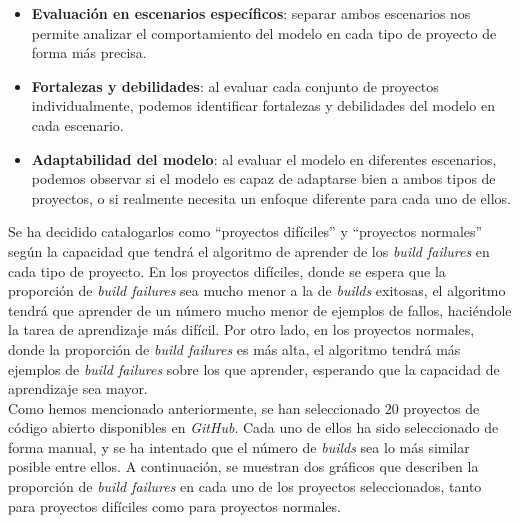 \begin{itemize}
    \item \textbf{Evaluación en escenarios específicos}: separar ambos escenarios nos permite
    analizar el comportamiento del modelo en cada tipo de proyecto de forma más precisa.\\

    \item \textbf{Fortalezas y debilidades}: al evaluar cada conjunto de proyectos individualmente,
    podemos identificar fortalezas y debilidades del modelo en cada escenario.\\

    \item \textbf{Adaptabilidad del modelo}: al evaluar el modelo en diferentes escenarios, podemos
    observar si el modelo es capaz de adaptarse bien a ambos tipos de proyectos, o si realmente
    necesita un enfoque diferente para cada uno de ellos.\\
\end{itemize}

Se ha decidido catalogarlos como ``proyectos difíciles'' y ``proyectos normales'' según la
capacidad que tendrá el algoritmo de aprender de los \textit{build failures} en cada tipo de 
proyecto. En los proyectos difíciles, donde se espera que la proporción de \textit{build
failures} sea mucho menor a la de \textit{builds} exitosas, el algoritmo tendrá que aprender
de un número mucho menor de ejemplos de fallos, haciéndole la tarea de aprendizaje más difícil.
Por otro lado, en los proyectos normales, donde la proporción de \textit{build failures} es
más alta, el algoritmo tendrá más ejemplos de \textit{build failures} sobre los que aprender,
esperando que la capacidad de aprendizaje sea mayor.\\

Como hemos mencionado anteriormente, se han seleccionado $20$ proyectos de código abierto
disponibles en \textit{GitHub}. Cada uno de ellos ha sido seleccionado de forma manual, y se
ha intentado que el número de \textit{builds} sea lo más similar posible entre ellos. A
continuación, se muestran dos gráficos que describen la proporción de \textit{build failures}
en cada uno de los proyectos seleccionados, tanto para proyectos difíciles como para proyectos
normales.\\

